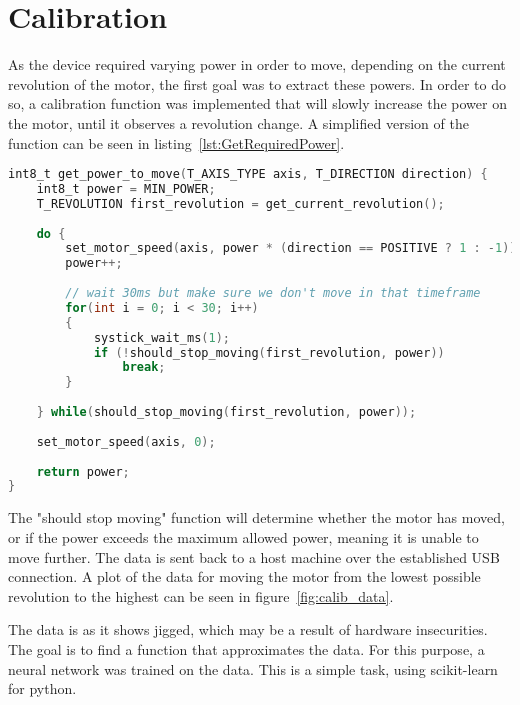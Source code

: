 \section{Calibration}

As the device required varying power in order to move, depending on the current revolution of the motor, the first goal was to extract these powers.
In order to do so, a calibration function was implemented that will slowly increase the power on the motor, until it observes a revolution change. A simplified version of the function can be seen in listing~\ref{lst:GetRequiredPower}.


\begin{lstlisting}[language=C,label={lst:GetRequiredPower},caption={Getting required power to move }]
int8_t get_power_to_move(T_AXIS_TYPE axis, T_DIRECTION direction) {
	int8_t power = MIN_POWER;
	T_REVOLUTION first_revolution = get_current_revolution();
	
	do {
		set_motor_speed(axis, power * (direction == POSITIVE ? 1 : -1));
		power++;
		
		// wait 30ms but make sure we don't move in that timeframe
		for(int i = 0; i < 30; i++)
		{
			systick_wait_ms(1);
			if (!should_stop_moving(first_revolution, power))
				break;
		}
	
	} while(should_stop_moving(first_revolution, power));
	
	set_motor_speed(axis, 0);
	
	return power;
}

\end{lstlisting}

The "should stop moving" function will determine whether the motor has moved, or if the power exceeds the maximum allowed power, meaning it is unable to move further.
The data is sent back to a host machine over the established USB connection.
A plot of the data for moving the motor from the lowest possible revolution to the highest can be seen in figure~\ref{fig:calib_data}.


The data is as it shows jigged, which may be a result of hardware insecurities.
The goal is to find a function that approximates the data. 
For this purpose, a neural network was trained on the data.
This is a simple task, using scikit-learn for python.


